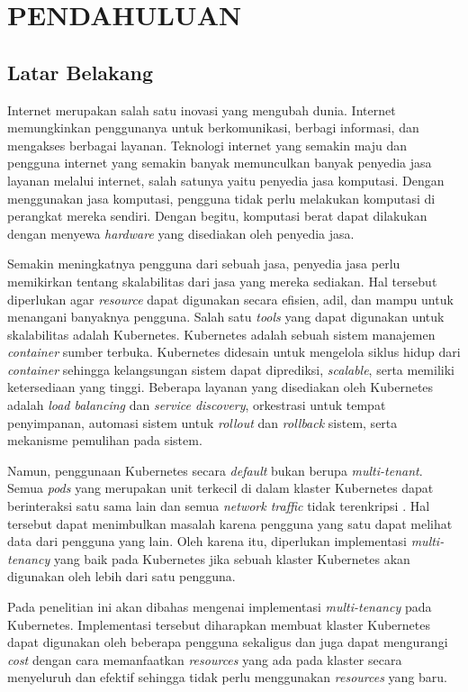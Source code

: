 \chapter{PENDAHULUAN}

\section{Latar Belakang}

Internet merupakan salah satu inovasi yang mengubah dunia. Internet
memungkinkan penggunanya untuk berkomunikasi, berbagi informasi, dan
mengakses berbagai layanan. Teknologi internet yang semakin maju
dan pengguna internet yang semakin banyak memunculkan banyak penyedia
jasa layanan melalui internet, salah satunya yaitu penyedia jasa komputasi.
Dengan menggunakan jasa komputasi, pengguna tidak perlu melakukan komputasi
di perangkat mereka sendiri. Dengan begitu, komputasi berat dapat dilakukan
dengan menyewa \emph{hardware} yang disediakan oleh penyedia jasa.

Semakin meningkatnya pengguna dari sebuah jasa, penyedia jasa perlu
memikirkan tentang skalabilitas dari jasa yang mereka sediakan. Hal tersebut
diperlukan agar \emph{resource} dapat digunakan secara efisien, adil, dan mampu
untuk menangani banyaknya pengguna. Salah satu \emph{tools} yang dapat digunakan
untuk skalabilitas adalah Kubernetes. Kubernetes adalah sebuah sistem manajemen
\emph{container} sumber terbuka. Kubernetes didesain untuk mengelola siklus hidup
dari \emph{container} sehingga kelangsungan sistem dapat diprediksi, \emph{scalable},
serta memiliki ketersediaan yang tinggi. Beberapa layanan yang disediakan oleh
Kubernetes adalah \emph{load balancing} dan \emph{service discovery},
orkestrasi untuk tempat penyimpanan, automasi sistem untuk \emph{rollout}
dan \emph{rollback} sistem, serta mekanisme pemulihan pada sistem.

Namun, penggunaan Kubernetes secara \emph{default} bukan berupa \emph{multi-tenant}.
Semua \emph{pods} yang merupakan unit terkecil di dalam klaster Kubernetes dapat
berinteraksi satu sama lain dan semua \emph{network traffic} tidak terenkripsi \parencite{kubernetes-website-multi-tenancy}.
Hal tersebut dapat menimbulkan masalah karena pengguna yang satu dapat
melihat data dari pengguna yang lain. Oleh karena itu, diperlukan
implementasi \emph{multi-tenancy} yang baik pada Kubernetes jika
sebuah klaster Kubernetes akan digunakan oleh lebih dari satu pengguna.

Pada penelitian ini akan dibahas mengenai implementasi \emph{multi-tenancy}
pada Kubernetes. Implementasi tersebut diharapkan membuat klaster
Kubernetes dapat digunakan oleh beberapa pengguna sekaligus dan juga dapat
mengurangi \emph{cost} dengan cara memanfaatkan \emph{resources} yang ada
pada klaster secara menyeluruh dan efektif sehingga tidak perlu menggunakan
\emph{resources} yang baru.

